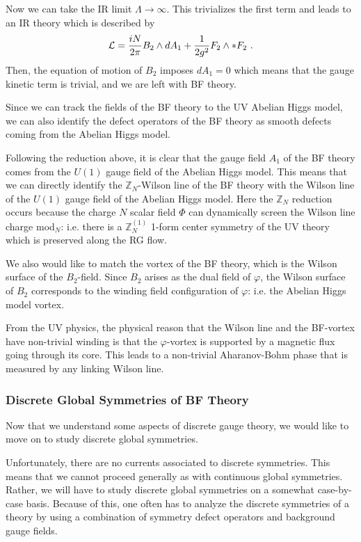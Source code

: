 \documentclass[11pt]{article}
\def\CL {{\cal L}}
\def\IZ{{\mathbb{Z}}}
\def\beq{\begin{equation}}
\def\eeq{\end{equation}}
\begin{document}
 
Now we can take the IR limit $\Lambda \to \infty$. This trivializes the first term and leads to an IR theory which is described by 
%
\beq
\CL =  \frac{iN}{2\pi} B_2 \wedge d A_1 + \frac{1}{2g^2} F_2 \wedge \ast  F_2 ~.
\eeq
%
Then, the equation of motion of $B_2$ imposes $d A_1 = 0$ which means that the gauge kinetic term is trivial, and we are left with BF theory.

 
Since we can track the fields of the BF theory to the UV Abelian Higgs model, we can also identify the defect operators of the BF theory as smooth defects coming from the Abelian Higgs model. 

Following the reduction above, it is clear that the gauge field $A_1$ of the BF theory comes from  the $U(1)$ gauge field of the Abelian Higgs model. This means that  we can directly identify the $\IZ_N$-Wilson line of the BF theory with the Wilson line of the $U(1)$ gauge field of the Abelian Higgs model. Here the $\IZ_N$ reduction occurs because the charge $N$ scalar field $\Phi$ can dynamically screen the Wilson line charge mod$_N$: i.e. there is a $\IZ_N^{(1)}$ 1-form center symmetry of the UV theory which is preserved along the RG flow. 

We also would like to match the vortex of the BF theory, which is the Wilson surface of the $B_2$-field. Since $B_2$ arises as the dual field of $\varphi$, the Wilson surface of $B_2$ corresponds to the winding field configuration of $\varphi$: i.e. the Abelian Higgs model vortex.

From the UV physics, the physical reason that the Wilson line and the BF-vortex have non-trivial winding is that the $\varphi$-vortex is supported by a magnetic flux going through its core. This leads to a non-trivial Aharanov-Bohm phase that is measured by any linking Wilson line. 




\subsubsection{Discrete Global Symmetries of BF Theory}
\label{subsubsec:BF_global symmetry}

Now that we understand some aspects of discrete gauge theory, we would like to move on to study discrete global symmetries.  

Unfortunately, there are no currents associated to discrete symmetries. This means that we cannot proceed generally as with continuous global symmetries. Rather, we will have to study discrete global symmetries on a somewhat case-by-case basis. Because of this, one often has to analyze the discrete symmetries of a theory by using a combination of symmetry defect operators and background gauge fields. 
 
\end{document}
